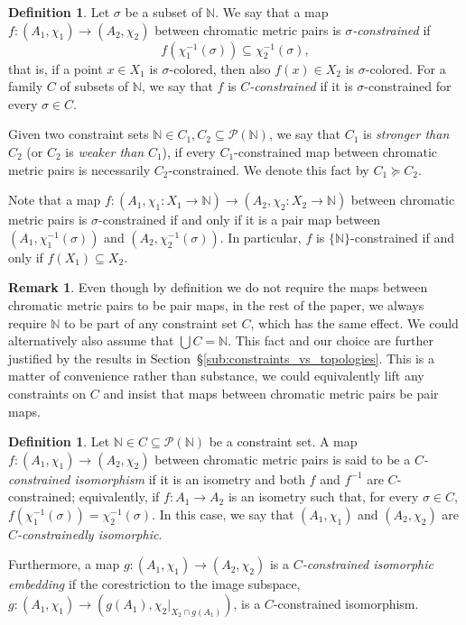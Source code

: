 \documentclass[8pt,a4paper,oneside,english,english]{article}
\theoremstyle{plain}
\theoremstyle
{plain}
\theoremstyle{definition}
\newtheorem{definition}[theorem]{Definition}%
\newtheorem{remark}[theorem]{Remark}%
\newcommand{\N}{\mathbb{N}}
\newcommand{\MP}[1]{(A_{#1},\chi_{#1})}
\newcommand{\extMP}[1]{(A_{#1},\chi_{#1}\colon X_{#1}\to\N)}
\begin{document}
\begin{definition}
    Let $\sigma$ be a subset of $\N$. We say that a map $f\colon\MP{1}\to\MP{2}$ between chromatic metric pairs is {\em $\sigma$-constrained} if 
    \[
        f(\chi_1^{-1}(\sigma))\subseteq\chi_2^{-1}(\sigma),
    \]
    that is, if a point $x\in X_1$ is $\sigma$-colored, then also $f(x) \in X_2$ is $\sigma$-colored. For a family $C$ of subsets of $\N$, we say that $f$ is {\em $C$-constrained} if it is $\sigma$-constrained for every $\sigma\in C$.

    Given two constraint sets $\N\in C_1,C_2\subseteq\mathcal P(\N)$, we say that $C_1$ is {\em stronger than} $C_2$ (or $C_2$ is {\em weaker than} $C_1$), if every $C_1$-constrained map between chromatic metric pairs is necessarily $C_2$-constrained. We denote this fact by $C_1\succeq C_2$.
\end{definition}

Note that a map $f\colon\extMP{1}\to\extMP{2}$ between chromatic metric pairs is $\sigma$-constrained if and only if it is a pair map between $(A_1, \chi_1^{-1}(\sigma))$ and $(A_2, \chi_2^{-1}(\sigma))$. In particular, $f$ is $\{\N\}$-constrained if and only if $f(X_1)\subseteq X_2$.

\begin{remark}\label{remark:always-include-N}
    Even though by definition we do not require the maps between chromatic metric pairs to be pair maps, in the rest of the paper, we always require $\N$ to be part of any constraint set $C$, which has the same effect. We could alternatively
    also assume that $\bigcup C = \N$.
    This fact and our choice are further justified by the results in Section~\S\ref{sub:constraints_vs_topologies}. This is a matter of convenience rather than substance, we could equivalently lift any constraints on $C$ and insist that maps between chromatic metric pairs be pair maps.
\end{remark}

\begin{definition}
	Let $\N\in C\subseteq\mathcal P(\N)$ be a constraint set. A map $f\colon\MP{1}\to\MP{2}$ between chromatic metric pairs is said to be a {\em $C$-constrained isomorphism} if it is an isometry and both $f$ and $f^{-1}$ are $C$-constrained; equivalently, if $f\colon A_1\to A_2$ is an isometry such that, for every $\sigma\in C$, $f(\chi_1^{-1}(\sigma))=\chi_2^{-1}(\sigma)$. In this case, we say that $\MP{1}$ and $\MP{2}$ are {\em $C$-constrainedly isomorphic}. 
	
    Furthermore, a map $g\colon\MP{1}\to\MP{2}$ is a {\em $C$-constrained isomorphic embedding} if the corestriction to the image subspace,
    $g\colon (A_1, \chi_1)\to (g(A_1), \chi_2|_{X_2\cap g(A_1)})$, is a $C$-constrained isomorphism.
    
\end{definition}
\end{document}
